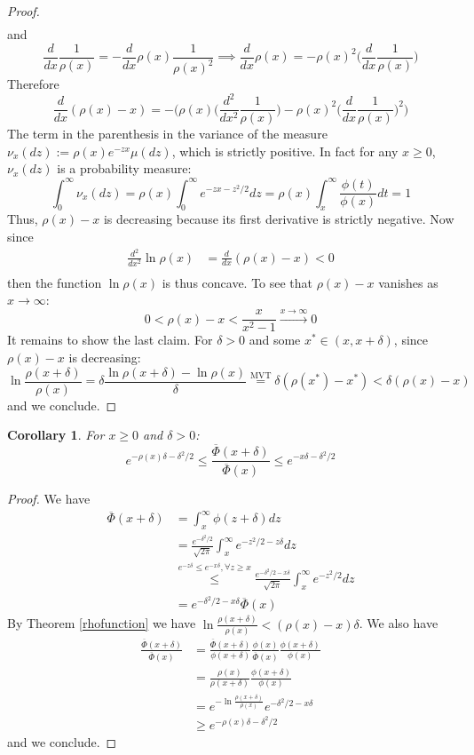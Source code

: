 \documentclass{article}
\newtheorem{corollary}{Corollary}[section]
\begin{document}
\begin{proof}
$$\begin{aligned}
	\end{aligned}$$
	and
	$$\frac{d}{dx}\frac{1}{\rho(x)}=-\frac{d}{dx}\rho(x)\frac{1}{\rho(x)^2}\implies \frac{d}{dx}\rho(x)=-\rho(x)^2\bigg(\frac{d}{dx}\frac{1}{\rho(x)}\bigg)$$
	Therefore 
	$$\frac{d}{dx}(\rho(x)-x)=-\bigg(\rho(x)\bigg(\frac{d^2}{dx^2}\frac{1}{\rho(x)}\bigg)-\rho(x)^2\bigg(\frac{d}{dx}\frac{1}{\rho(x)}\bigg)^2\bigg)$$
	The term in the parenthesis in the variance of the measure $\nu_x(dz):=\rho(x)e^{-zx}\mu(dz)$, which is strictly positive. In fact for any $x\geq 0$, $\nu_x(dz)$ is a probability measure:
	$$\int_0^\infty\nu_x(dz)=\rho(x)\int_0^\infty e^{-zx-z^2/2}dz=\rho(x)\int_x^\infty\frac{\phi(t)}{\phi(x)}dt=1$$
	Thus, $\rho(x)-x$ is decreasing because its first derivative is strictly negative. Now since
	$$\begin{aligned}
	\frac{d^2}{dx^2}\ln \rho(x)&=\frac{d}{dx}(\rho(x)-x)<0\\
	\end{aligned}$$
	then the function $\ln \rho(x)$ is thus concave. To see that $\rho(x)-x$ vanishes as $x\to \infty$:
	$$0<\rho(x)-x<\frac{x}{x^2-1}\stackrel{x\to \infty}{\to} 0$$
	It remains to show the last claim. For $\delta >0$ and some $x^*\in (x,x+\delta)$, since $\rho(x)-x$ is decreasing:
	$$\ln\frac{\rho(x+\delta)}{\rho(x)}=\delta \frac{\ln \rho(x+\delta)-\ln \rho(x)}{\delta}\stackrel{\textrm{MVT}}{=}\delta(\rho(x^*)-x^*)<\delta(\rho(x)-x)$$
	and we conclude.
\end{proof}

\begin{corollary}
\label{corol_th1}
For $x\geq 0$ and $\delta>0$:
$$e^{-\rho(x)\delta -\delta^2/2}\leq \frac{\overline{\Phi}(x+\delta)}{\overline{\Phi}(x)}\leq e^{-x\delta -\delta^2/2}$$
\end{corollary}
\begin{proof} We have
$$\begin{aligned}\overline{\Phi}(x+\delta)&=\int_{x}^\infty\phi(z+\delta)dz\\
&=\frac{e^{-\delta^2/2}}{\sqrt{2\pi}}\int_{x}^\infty e^{-z^2/2-z\delta}dz\\
&\stackrel{e^{-z\delta}\leq e^{-x\delta},\forall z\geq x}{\leq }\frac{e^{-\delta^2/2-x\delta}}{\sqrt{2\pi}}\int_{x}^\infty e^{-z^2/2}dz\\
&=e^{-\delta^2/2-x\delta}\overline{\Phi}(x)
\end{aligned}$$
By Theorem \ref{rhofunction} we have $
\ln\frac{\rho(x+\delta)}{\rho(x)}< (\rho(x)-x)\delta$. We also have
$$\begin{aligned}\frac{\overline{\Phi}(x+\delta)}{\overline{\Phi}(x)}&=\frac{\overline{\Phi}(x+\delta)}{\phi(x+\delta)}\frac{\phi(x)}{\overline{\Phi}(x)}\frac{\phi(x+\delta)}{\phi(x)}\\
&=\frac{\rho(x)}{\rho(x+\delta)}\frac{\phi(x+\delta)}{\phi(x)}\\
&=e^{-\ln\frac{\rho(x+\delta)}{\rho(x)}}e^{-\delta^2/2-x\delta}\\
&\geq e^{-\rho(x)\delta -\delta^2/2}
\end{aligned}$$
and we conclude.
\end{proof}
\end{document}
